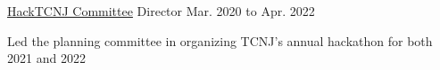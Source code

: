 

\begin{cventry}
    {\href{https://www.tcnj.edu/~acm}{HackTCNJ Committee}}
    {Director}
    {Mar. 2020 to Apr. 2022}
    {}{}
    \begin{cvparagraph}
        Led the planning committee in organizing TCNJ's annual hackathon for both 2021 and 2022
    \end{cvparagraph}
\end{cventry}
